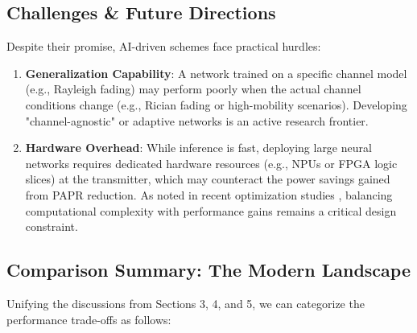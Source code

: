\documentclass[conference]{IEEEtran}
\begin{document}
\subsection{Challenges \& Future Directions}
Despite their promise, AI-driven schemes face practical hurdles:

\begin{enumerate}
    \item \textbf{Generalization Capability}: A network trained on a specific channel model (e.g., Rayleigh fading) may perform poorly when the actual channel conditions change (e.g., Rician fading or high-mobility scenarios). Developing "channel-agnostic" or adaptive networks is an active research frontier.
    \item \textbf{Hardware Overhead}: While inference is fast, deploying large neural networks requires dedicated hardware resources (e.g., NPUs or FPGA logic slices) at the transmitter, which may counteract the power savings gained from PAPR reduction. As noted in recent optimization studies \cite{ref4}, balancing computational complexity with performance gains remains a critical design constraint.
\end{enumerate}

\subsection{Comparison Summary: The Modern Landscape}
Unifying the discussions from Sections 3, 4, and 5, we can categorize the performance trade-offs as follows:
\end{document}
